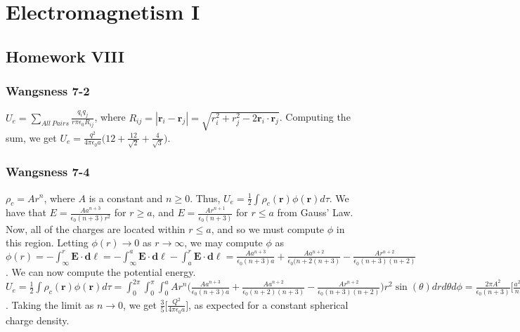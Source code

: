 \documentclass[crop=false,class=article,oneside]{standalone}
\begin{document}
    \ifx\ifphysicscourseselectromagnetismI\undefined
        \section*{Electromagnetism I}
        \setcounter{section}{8}
        \renewcommand\thesubfigure{%
            \arabic{section}.\arabic{figure}.\arabic{subfigure}%
        }
    \fi
    \subsection{Homework VIII}
        \subsubsection{Wangsness 7-2}
        $U_e = \underset{All\ Pairs}\sum\frac{q_i q_j}{r\pi \epsilon_0 R_{ij}}$, where $R_{ij} = |\mathbf{r}_i-\mathbf{r}_j| = \sqrt{r_i^2+r_j^2 -2\mathbf{r}_i\cdot \mathbf{r}_j}$. Computing the sum, we get $U_e = \frac{q^2}{4\pi \epsilon_0 a}\big(12 + \frac{12}{\sqrt{2}}+\frac{4}{\sqrt{3}}\big)$.
        \subsubsection{Wangsness 7-4}
        $\rho_c = Ar^n$, where $A$ is a constant and $n\geq 0$. Thus, $U_e = \frac{1}{2} \int \rho_c(\mathbf{r})\phi(\mathbf{r})d\tau$. We have that $E = \frac{Aa^{n+3}}{\epsilon_0 (n+3)r^2}$ for $r\geq a$, and $E=\frac{Ar^{n+1}}{\epsilon_0(n+3)}$ for $r\leq a$ from Gauss' Law. Now, all of the charges are located within $r\leq a$, and so we must compute $\phi$ in this region. Letting $\phi(r)\rightarrow 0$ as $r\rightarrow \infty$, we may compute $\phi$ as $\phi(r) = -\int_{\infty}^{r}\mathbf{E}\cdot \mathbf{d\ell} = -\int_{\infty}^{a} \mathbf{E}\cdot \mathbf{d\ell} - \int_{a}^{r}\mathbf{E}\cdot \mathbf{d\ell} = \frac{Aa^{n+3}}{\epsilon_0(n+3)a}+\frac{Aa^{n+2}}{\epsilon_0(n+2(n+3)}-\frac{Ar^{n+2}}{\epsilon_0(n+3)(n+2)}$. We can now compute  the potential energy. $U_e =\frac{1}{2}\int \rho_c(\mathbf{r})\phi(\mathbf{r})d\tau = \int_{0}^{2\pi} \int_{0}^{\pi}\int_{0}^{a} A r^n \bigg(\frac{Aa^{n+3}}{\epsilon_0(n+3)a}+\frac{Aa^{n+2}}{\epsilon_0(n+2)(n+3)}-\frac{Ar^{n+2}}{\epsilon_0(n+3)(n+2)}\bigg)r^2 \sin(\theta)dr d\theta d\phi = \frac{2\pi A^2}{\epsilon_0 (n+3)}\bigg[\frac{a^{2n+5}}{n+3}+\frac{a^{2n+5}}{(n+2)(n+3)}-\frac{a^{2n+5}}{(n+2)(2n+5)}\bigg]$. Taking the limit as $n\rightarrow 0$, we get $\frac{3}{5}\bigg[\frac{Q^2}{4\pi \epsilon_0 a}\bigg]$, as expected for a constant spherical charge density.
\end{document}
